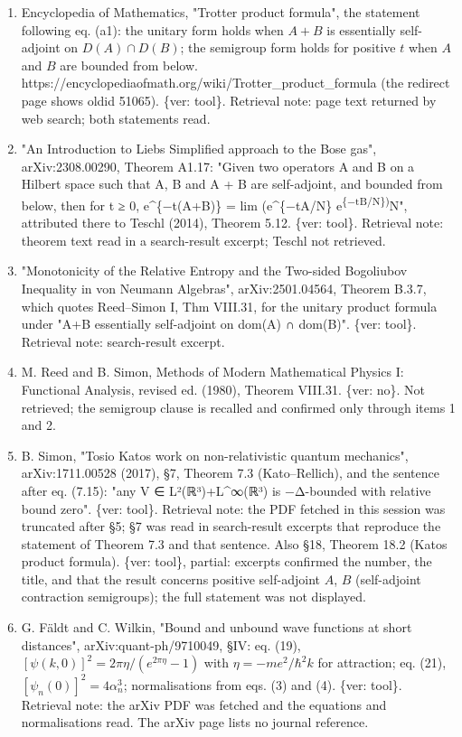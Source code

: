 \documentclass[11pt,a4paper]{article}
\providecommand{\tightlist}{\setlength{\itemsep}{0pt}\setlength{\parskip}{0pt}}
\begin{document}
\begin{enumerate}
\def\labelenumi{\arabic{enumi}.}
\tightlist
\item
  Encyclopedia of Mathematics, "Trotter product formula", the statement following eq. (a1): the unitary form holds when \(A+B\) is essentially self-adjoint on \(D(A)\cap D(B)\); the semigroup form holds for positive \(t\) when \(A\) and \(B\) are bounded from below. https://encyclopediaofmath.org/wiki/Trotter\_product\_formula (the redirect page shows oldid 51065). \{ver: tool\}. Retrieval note: page text returned by web search; both statements read.
\item
  "An Introduction to Lieb\textquotesingle s Simplified approach to the Bose gas", arXiv:2308.00290, Theorem A1.17: "Given two operators A and B on a Hilbert space such that A, B and A + B are self-adjoint, and bounded from below, then for t ≥ 0, e\^{}\{−t(A+B)\} = lim (e\^{}\{−tA/N\} e\textsuperscript{\{−tB/N\})}N", attributed there to Teschl (2014), Theorem 5.12. \{ver: tool\}. Retrieval note: theorem text read in a search-result excerpt; Teschl not retrieved.
\item
  "Monotonicity of the Relative Entropy and the Two-sided Bogoliubov Inequality in von Neumann Algebras", arXiv:2501.04564, Theorem B.3.7, which quotes Reed--Simon I, Thm VIII.31, for the unitary product formula under "A+B essentially self-adjoint on dom(A) ∩ dom(B)". \{ver: tool\}. Retrieval note: search-result excerpt.
\item
  M. Reed and B. Simon, Methods of Modern Mathematical Physics I: Functional Analysis, revised ed. (1980), Theorem VIII.31. \{ver: no\}. Not retrieved; the semigroup clause is recalled and confirmed only through items 1 and 2.
\item
  B. Simon, "Tosio Kato\textquotesingle s work on non-relativistic quantum mechanics", arXiv:1711.00528 (2017), §7, Theorem 7.3 (Kato--Rellich), and the sentence after eq. (7.15): "any V ∈ L²(ℝ³)+L\^{}∞(ℝ³) is −Δ-bounded with relative bound zero". \{ver: tool\}. Retrieval note: the PDF fetched in this session was truncated after §5; §7 was read in search-result excerpts that reproduce the statement of Theorem 7.3 and that sentence. Also §18, Theorem 18.2 (Kato\textquotesingle s product formula). \{ver: tool\}, partial: excerpts confirmed the number, the title, and that the result concerns positive self-adjoint \(A\), \(B\) (self-adjoint contraction semigroups); the full statement was not displayed.
\item
  G. Fäldt and C. Wilkin, "Bound and unbound wave functions at short distances", arXiv:quant-ph/9710049, §IV: eq. (19), \([\psi(k,0)]^2=2\pi\eta/(e^{2\pi\eta}-1)\) with \(\eta=-me^2/\hbar^2k\) for attraction; eq. (21), \([\psi_n(0)]^2=4\alpha_n^3\); normalisations from eqs. (3) and (4). \{ver: tool\}. Retrieval note: the arXiv PDF was fetched and the equations and normalisations read. The arXiv page lists no journal reference.

\end{enumerate}
\end{document}
